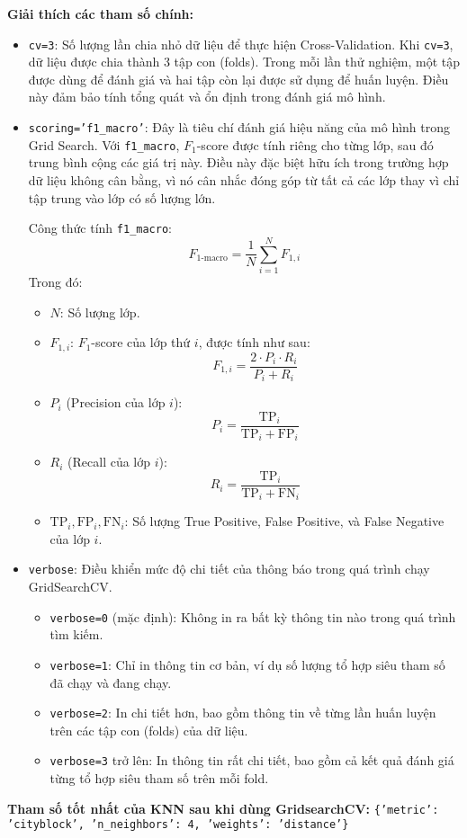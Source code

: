 \documentclass[a4paper,12pt]{article}
\begin{document}
\noindent \textbf{Giải thích các tham số chính:}
\begin{itemize}
    \item \texttt{cv=3}: Số lượng lần chia nhỏ dữ liệu để thực hiện Cross-Validation. Khi \texttt{cv=3}, dữ liệu được chia thành 3 tập con (folds). Trong mỗi lần thử nghiệm, một tập được dùng để đánh giá và hai tập còn lại được sử dụng để huấn luyện. Điều này đảm bảo tính tổng quát và ổn định trong đánh giá mô hình.
    
    \item \texttt{scoring='f1\_macro'}: Đây là tiêu chí đánh giá hiệu năng của mô hình trong Grid Search. Với \texttt{f1\_macro}, $F_{1}$-score được tính riêng cho từng lớp, sau đó trung bình cộng các giá trị này. Điều này đặc biệt hữu ích trong trường hợp dữ liệu không cân bằng, vì nó cân nhắc đóng góp từ tất cả các lớp thay vì chỉ tập trung vào lớp có số lượng lớn.

    \noindent Công thức tính \texttt{f1\_macro}:
    \[
    F_{1\text{-macro}} = \frac{1}{N} \sum_{i=1}^{N} F_{1, i}
    \]
    Trong đó:
    \begin{itemize}
        \item \( N \): Số lượng lớp.
        \item \( F_{1, i} \): $F_{1}$-score của lớp thứ \( i \), được tính như sau:
        \[
        F_{1, i} = \frac{2 \cdot P_{i} \cdot R_{i}}{P_{i} + R_{i}}
        \]
        \item \( P_{i} \) (Precision của lớp \( i \)): 
        \[
        P_{i} = \frac{\text{TP}_{i}}{\text{TP}_{i} + \text{FP}_{i}}
        \]
        \item \( R_{i} \) (Recall của lớp \( i \)): 
        \[
        R_{i} = \frac{\text{TP}_{i}}{\text{TP}_{i} + \text{FN}_{i}}
        \]
        \item \( \text{TP}_{i}, \text{FP}_{i}, \text{FN}_{i} \): Số lượng True Positive, False Positive, và False Negative của lớp \( i \).
    \end{itemize}

    \item \texttt{verbose}: Điều khiển mức độ chi tiết của thông báo trong quá trình chạy GridSearchCV. 
    \begin{itemize}
        \item \texttt{verbose=0} (mặc định): Không in ra bất kỳ thông tin nào trong quá trình tìm kiếm.
        \item \texttt{verbose=1}: Chỉ in thông tin cơ bản, ví dụ số lượng tổ hợp siêu tham số đã chạy và đang chạy.
        \item \texttt{verbose=2}: In chi tiết hơn, bao gồm thông tin về từng lần huấn luyện trên các tập con (folds) của dữ liệu.
        \item \texttt{verbose=3} trở lên: In thông tin rất chi tiết, bao gồm cả kết quả đánh giá từng tổ hợp siêu tham số trên mỗi fold.
    \end{itemize}
\end{itemize}
\noindent \textbf{Tham số tốt nhất của KNN sau khi dùng GridsearchCV:} \texttt{\{'metric': 'cityblock', 'n\_neighbors': 4, 'weights': 'distance'\}}
\end{document}
